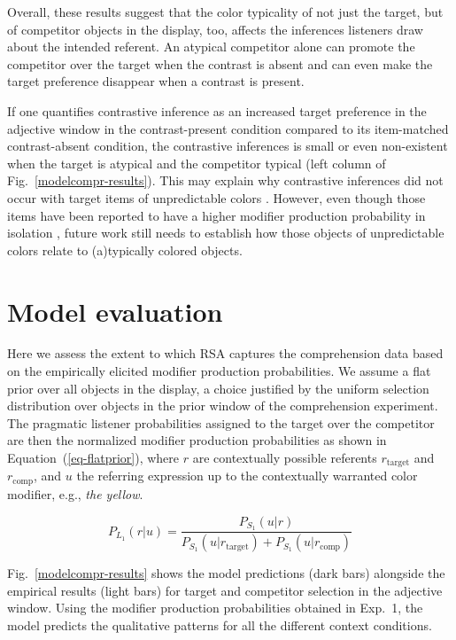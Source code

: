 \documentclass[10pt,letterpaper]{article}
\newcommand{\figref}[1]{Fig.~\ref{#1}}
\begin{document}
Overall, these results suggest that the color typicality of not just the target, but of competitor objects in the display, too, affects the inferences listeners draw about the intended referent. An atypical competitor alone can promote the competitor over the target when the contrast is absent and can even make the target preference disappear when a contrast is present. %

If one quantifies contrastive inference as an increased target preference in the adjective window in the contrast-present condition compared to its item-matched contrast-absent condition, the contrastive inferences is small or even non-existent when the target is atypical and the competitor typical (left column of \figref{modelcompr-results}). This may explain why contrastive inferences did not occur with target items of unpredictable colors \cite{Sedivy:2003}. However, even though those items have been reported to have a higher modifier production probability in isolation \cite{Sedivy:2003}, future work still needs to establish how those objects of unpredictable colors relate to (a)typically colored objects.

\section{Model evaluation}

Here we assess the extent to which RSA captures the comprehension data based on the empirically elicited modifier production probabilities. We assume a flat prior over all objects in the display, a choice justified by the uniform selection distribution over objects in the prior window of the comprehension experiment. The pragmatic listener probabilities assigned to the target over the competitor are then the normalized modifier production probabilities as shown in Equation~(\ref{eq-flatprior}), where $r$ are contextually possible referents $r_{\text{target}}$ and $r_{\text{comp}}$, and $u$ the referring expression up to the contextually warranted color modifier, e.g., \emph{the yellow}.

\begin{equation}
	P_{L_1}(r|u) = \frac{P_{S_1}(u|r)}{P_{S_1}(u|r_{\text{target}}) + P_{S_1}(u|r_{\text{comp}})}
\label{eq-flatprior}
\end{equation}

\figref{modelcompr-results} shows the model predictions (dark bars) alongside the empirical results (light bars) for target and competitor selection in the adjective window. Using the modifier production probabilities obtained in Exp.~1, the model predicts the qualitative patterns for all the different context conditions. 
\end{document}
